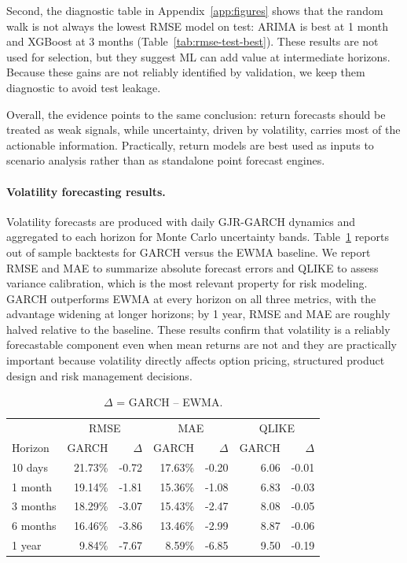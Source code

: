 \documentclass[11pt,a4paper]{article}
\begin{document}
\noindent Second, the diagnostic table in Appendix~\ref{app:figures} shows that the random walk is not always the lowest RMSE model on test: ARIMA is best at 1 month and XGBoost at 3 months (Table~\ref{tab:rmse-test-best}). These results are not used for selection, but they suggest ML can add value at intermediate horizons. Because these gains are not reliably identified by validation, we keep them diagnostic to avoid test leakage.

\noindent Overall, the evidence points to the same conclusion: return forecasts should be treated as weak signals, while uncertainty, driven by volatility, carries most of the actionable information. Practically, return models are best used as inputs to scenario analysis rather than as standalone point forecast engines.

\paragraph{Volatility forecasting results.}
Volatility forecasts are produced with daily GJR-GARCH dynamics and aggregated to each horizon for Monte Carlo uncertainty bands. Table~\ref{tab:volatility} reports out of sample backtests for GARCH versus the EWMA baseline. We report RMSE and MAE to summarize absolute forecast errors and QLIKE to assess variance calibration, which is the most relevant property for risk modeling. GARCH outperforms EWMA at every horizon on all three metrics, with the advantage widening at longer horizons; by 1 year, RMSE and MAE are roughly halved relative to the baseline. These results confirm that volatility is a reliably forecastable component even when mean returns are not and they are practically important because volatility directly affects option pricing, structured product design and risk management decisions.

\begin{table}[H]
\centering
\small
\setlength{\tabcolsep}{4pt}
\renewcommand{\arraystretch}{1.0}
\caption{Volatility backtest (annualized, TSLA).}
\label{tab:volatility}
\begin{tabular}{l r r r r r r}
\toprule
 & \multicolumn{2}{c}{RMSE} & \multicolumn{2}{c}{MAE} & \multicolumn{2}{c}{QLIKE} \\
Horizon & GARCH & $\Delta$ & GARCH & $\Delta$ & GARCH & $\Delta$ \\
\midrule
10 days  & 21.73\% & -0.72 & 17.63\% & -0.20 & 6.06 & -0.01 \\
1 month  & 19.14\% & -1.81 & 15.36\% & -1.08 & 6.83 & -0.03 \\
3 months & 18.29\% & -3.07 & 15.43\% & -2.47 & 8.08 & -0.05 \\
6 months & 16.46\% & -3.86 & 13.46\% & -2.99 & 8.87 & -0.06 \\
1 year   & 9.84\%  & -7.67 & 8.59\%  & -6.85 & 9.50 & -0.19 \\
\bottomrule
\end{tabular}
\caption*{\footnotesize$\Delta$ = GARCH -- EWMA.}
\end{table}
\end{document}
